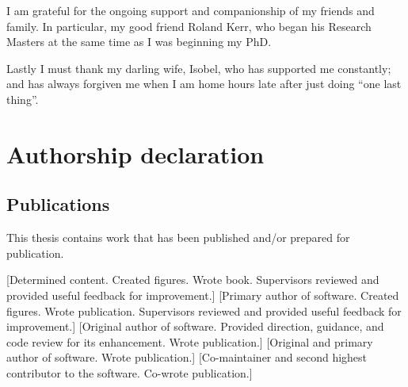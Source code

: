 \documentclass{book}
\begin{document}
I am grateful for the ongoing support and companionship of my friends and family.
In particular, my good friend Roland Kerr, who began his Research Masters at the same time as I was beginning my PhD.

Lastly I must thank my darling wife, Isobel, who has supported me constantly;
and has always forgiven me when I am home hours late after just doing ``one last thing''.


\chapter*{Authorship declaration}



\section*{Publications}

This thesis contains work that has been published and/or prepared for publication.






[Determined content. Created figures. Wrote book. Supervisors reviewed and provided useful feedback for improvement.]
[Primary author of software. Created figures. Wrote publication. Supervisors reviewed and provided useful feedback for improvement.]
[Original author of software. Provided direction, guidance, and code review for its enhancement. Wrote publication.]
[Original and primary author of software. Wrote publication.]
[Co-maintainer and second highest contributor to the software. Co-wrote publication.]
\end{document}
